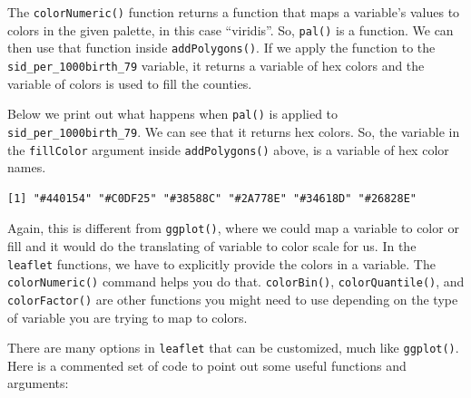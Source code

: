 \documentclass[
  letterpaper,
  DIV=11,
  numbers=noendperiod]{scrreprt}
\newenvironment{Shaded}{\begin{snugshade}}{\end{snugshade}}
\newcommand{\FunctionTok}[1]{\textcolor[rgb]{0.28,0.35,0.67}{#1}}
\newcommand{\NormalTok}[1]{\textcolor[rgb]{0.00,0.23,0.31}{#1}}
\newcommand{\SpecialCharTok}[1]{\textcolor[rgb]{0.37,0.37,0.37}{#1}}
\begin{document}
The \texttt{colorNumeric()} function returns a function that maps a
variable's values to colors in the given palette, in this case
``viridis''. So, \texttt{pal()} is a function. We can then use that
function inside \texttt{addPolygons()}. If we apply the function to the
\texttt{sid\_per\_1000birth\_79} variable, it returns a variable of hex
colors and the variable of colors is used to fill the counties.

Below we print out what happens when \texttt{pal()} is applied to
\texttt{sid\_per\_1000birth\_79}. We can see that it returns hex colors.
So, the variable in the \texttt{fillColor} argument inside
\texttt{addPolygons()} above, is a variable of hex color names.

\begin{Shaded}
\end{Shaded}

\begin{verbatim}
[1] "#440154" "#C0DF25" "#38588C" "#2A778E" "#34618D" "#26828E"
\end{verbatim}

Again, this is different from \texttt{ggplot()}, where we could map a
variable to color or fill and it would do the translating of variable to
color scale for us. In the \texttt{leaflet} functions, we have to
explicitly provide the colors in a variable. The \texttt{colorNumeric()}
command helps you do that. \texttt{colorBin()},
\texttt{colorQuantile()}, and \texttt{colorFactor()} are other functions
you might need to use depending on the type of variable you are trying
to map to colors.

There are many options in \texttt{leaflet} that can be customized, much
like \texttt{ggplot()}. Here is a commented set of code to point out
some useful functions and arguments:
\end{document}
